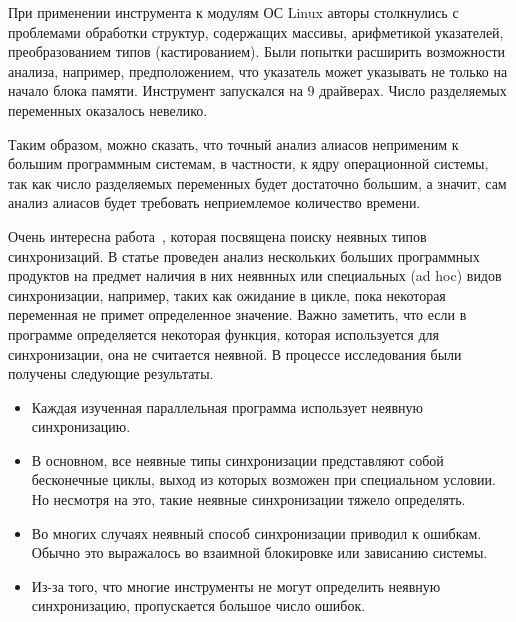 При применении инструмента к модулям ОС Linux авторы столкнулись с проблемами обработки структур, содержащих массивы, арифметикой указателей, преобразованием типов (кастированием).
Были попытки расширить возможности анализа, например, предположением, что указатель может указывать не только на начало блока памяти. 
Инструмент запускался на 9 драйверах. Число разделяемых переменных оказалось невелико.

Таким образом, можно сказать, что точный анализ алиасов неприменим к большим программным системам, в частности, к ядру операционной системы, так как число разделяемых переменных будет достаточно большим, а значит, сам анализ алиасов будет требовать неприемлемое количество времени.



Очень интересна работа~\cite{Xiong:2010}, которая посвящена поиску неявных типов синхронизаций.
В статье проведен анализ нескольких больших программных продуктов на предмет наличия в них неявнных или специальных (ad hoc) видов синхронизации, например, таких как ожидание в цикле, пока некоторая переменная не примет определенное значение.
Важно заметить, что если в программе определяется некоторая функция, которая используется для синхронизации, она не считается неявной.
В процессе исследования были получены следующие результаты.

\begin{itemize}
\item Каждая изученная параллельная программа использует неявную синхронизацию.
\item В основном, все неявные типы синхронизации представляют собой бесконечные циклы, выход из которых возможен при специальном условии. Но несмотря на это, такие неявные синхронизации тяжело определять.
\item Во многих случаях неявный способ синхронизации приводил к ошибкам. Обычно это выражалось во взаимной блокировке или зависанию системы. 
\item Из-за того, что многие инструменты не могут определить неявную синхронизацию, пропускается большое число ошибок. 
\end{itemize}

